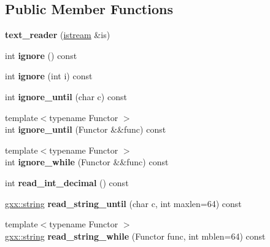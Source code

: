 \subsection*{Public Member Functions}
\begin{DoxyCompactItemize}
\item 
{\bfseries text\+\_\+reader} (\hyperlink{classgxx_1_1istream}{istream} \&is)\hypertarget{classgxx_1_1text__reader_a08d8cc2fa3dee77e59e4b6d917bc18d6}{}\label{classgxx_1_1text__reader_a08d8cc2fa3dee77e59e4b6d917bc18d6}

\item 
int {\bfseries ignore} () const \hypertarget{classgxx_1_1text__reader_a155a81ad88fc95b9478cfb01999c444b}{}\label{classgxx_1_1text__reader_a155a81ad88fc95b9478cfb01999c444b}

\item 
int {\bfseries ignore} (int i) const \hypertarget{classgxx_1_1text__reader_a5bcd35d9aabbddba8f1bfb08a7d09ac0}{}\label{classgxx_1_1text__reader_a5bcd35d9aabbddba8f1bfb08a7d09ac0}

\item 
int {\bfseries ignore\+\_\+until} (char c) const \hypertarget{classgxx_1_1text__reader_afea2204b774966cc28a2d87a9216b886}{}\label{classgxx_1_1text__reader_afea2204b774966cc28a2d87a9216b886}

\item 
{\footnotesize template$<$typename Functor $>$ }\\int {\bfseries ignore\+\_\+until} (Functor \&\&func) const \hypertarget{classgxx_1_1text__reader_a271b461cdc0e3d25c76955fc9e093acb}{}\label{classgxx_1_1text__reader_a271b461cdc0e3d25c76955fc9e093acb}

\item 
{\footnotesize template$<$typename Functor $>$ }\\int {\bfseries ignore\+\_\+while} (Functor \&\&func) const \hypertarget{classgxx_1_1text__reader_a5fc0b7cf5d3674367e40d433699c87c7}{}\label{classgxx_1_1text__reader_a5fc0b7cf5d3674367e40d433699c87c7}

\item 
int {\bfseries read\+\_\+int\+\_\+decimal} () const \hypertarget{classgxx_1_1text__reader_ab308dc04d06a1ae476489c304319c6dc}{}\label{classgxx_1_1text__reader_ab308dc04d06a1ae476489c304319c6dc}

\item 
\hyperlink{classgxx_1_1basic__string}{gxx\+::string} {\bfseries read\+\_\+string\+\_\+until} (char c, int maxlen=64) const \hypertarget{classgxx_1_1text__reader_a7d52ff161cc59eff8305cafecb7ab52c}{}\label{classgxx_1_1text__reader_a7d52ff161cc59eff8305cafecb7ab52c}

\item 
{\footnotesize template$<$typename Functor $>$ }\\\hyperlink{classgxx_1_1basic__string}{gxx\+::string} {\bfseries read\+\_\+string\+\_\+while} (Functor func, int mblen=64) const \hypertarget{classgxx_1_1text__reader_a27399fb86ffb36c128a8b99c19e749fe}{}\label{classgxx_1_1text__reader_a27399fb86ffb36c128a8b99c19e749fe}

\end{DoxyCompactItemize}
